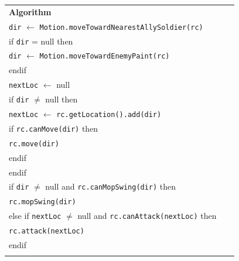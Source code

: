 \documentclass{article}
\newenvironment{pseudobox}
{
\centering
\begin{longtable}{|p{0.94\linewidth}|}
\hline
}
{
\\ \hline
\end{longtable}
\vspace{0.05cm}
}
\begin{document}
\begin{enumerate}[label=\alph*.]
\begin{pseudobox}
\textbf{Algorithm} \\

\hspace*{1.5em}\texttt{dir} $\leftarrow$ \texttt{Motion.moveTowardNearestAllySoldier(rc)} \\

\hspace*{1.5em}if \texttt{dir} = null then \\
\hspace*{3em}\texttt{dir} $\leftarrow$ \texttt{Motion.moveTowardEnemyPaint(rc)} \\
\hspace*{1.5em}endif \\

\hspace*{1.5em}\texttt{nextLoc} $\leftarrow$ null \\

\hspace*{1.5em}if \texttt{dir} $\neq$ null then \\

\hspace*{3em}\texttt{nextLoc} $\leftarrow$ \texttt{rc.getLocation().add(dir)} \\

\hspace*{3em}if \texttt{rc.canMove(dir)} then \\
\hspace*{4.5em}\texttt{rc.move(dir)} \\
\hspace*{3em}endif \\

\hspace*{1.5em}endif \\

\hspace*{1.5em}if \texttt{dir} $\neq$ null and \texttt{rc.canMopSwing(dir)} then \\
\hspace*{3em}\texttt{rc.mopSwing(dir)} \\

\hspace*{1.5em}else if \texttt{nextLoc} $\neq$ null and \texttt{rc.canAttack(nextLoc)} then \\
\hspace*{3em}\texttt{rc.attack(nextLoc)} \\
\hspace*{1.5em}endif \\
\end{pseudobox}


\end{enumerate}
\end{document}
